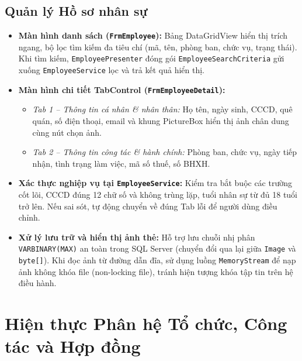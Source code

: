 \documentclass[12pt,a4paper]{report}
\begin{document}
\subsection{Quản lý Hồ sơ nhân sự}
\begin{itemize}[leftmargin=1.0cm]
    \item \textbf{Màn hình danh sách (\texttt{FrmEmployee}):} Bảng DataGridView hiển thị trích ngang, bộ lọc tìm kiếm đa tiêu chí (mã, tên, phòng ban, chức vụ, trạng thái). Khi tìm kiếm, \texttt{EmployeePresenter} đóng gói \texttt{EmployeeSearchCriteria} gửi xuống \texttt{EmployeeService} lọc và trả kết quả hiển thị.
    \item \textbf{Màn hình chi tiết TabControl (\texttt{FrmEmployeeDetail}):} 
    \begin{itemize}
        \item \textit{Tab 1 -- Thông tin cá nhân \& nhân thân:} Họ tên, ngày sinh, CCCD, quê quán, số điện thoại, email và khung PictureBox hiển thị ảnh chân dung cùng nút chọn ảnh.
        \item \textit{Tab 2 -- Thông tin công tác \& hành chính:} Phòng ban, chức vụ, ngày tiếp nhận, tình trạng làm việc, mã số thuế, số BHXH.
    \end{itemize}
    \item \textbf{Xác thực nghiệp vụ tại \texttt{EmployeeService}:} Kiểm tra bắt buộc các trường cốt lõi, CCCD đúng 12 chữ số và không trùng lặp, tuổi nhân sự từ đủ 18 tuổi trở lên. Nếu sai sót, tự động chuyển về đúng Tab lỗi để người dùng điều chỉnh.
    \item \textbf{Xử lý lưu trữ và hiển thị ảnh thẻ:} Hỗ trợ lưu chuỗi nhị phân \texttt{VARBINARY(MAX)} an toàn trong SQL Server (chuyển đổi qua lại giữa \texttt{Image} và \texttt{byte[]}). Khi đọc ảnh từ đường dẫn đĩa, sử dụng luồng \texttt{MemoryStream} để nạp ảnh không khóa file (non-locking file), tránh hiện tượng khóa tập tin trên hệ điều hành.
\end{itemize}

\section{Hiện thực Phân hệ Tổ chức, Công tác và Hợp đồng}
\end{document}
